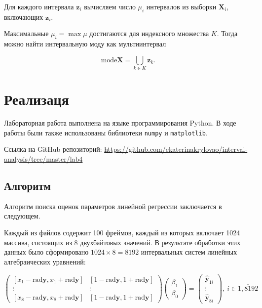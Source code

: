 \documentclass[a4paper,14pt]{article}
\begin{document}
  Для каждого интервала \( \mathbf{z}_i \) вычисляем число \( \mu_i \)
  интервалов из выборки \( \mathbf{X}_i \), включающих \( \mathbf{z}_i \).

  Максимальные \( \mu_i = \max \mu \) достигаются для индексного множества
  \( K \). Тогда можно найти интервальную моду как мультиинтервал

  \begin{equation}
    \text{mode} \mathbf{X} = \bigcup_{k \in K} \mathbf{z}_k.
  \end{equation}

  \section{Реализаця}

  Лабораторная работа выполнена на языке программирования Python. В ходе
  работы были также использованы библиотеки \verb!numpy! и
  \verb!matplotlib!.


  Ссылка на GitHub репозиторий:
  \url{https://github.com/ekaterinakrylovao/interval-analysis/tree/master/lab4}

  \subsection{Алгоритм}
  Алгоритм поиска оценок параметров линейной регрессии заключается в следующем.

  Каждый из файлов содержит 100 фреймов, каждый из которых включает
  1024 массива, состоящих из 8 двухбайтовых значений. В результате
  обработки этих данных было сформировано \( 1024 \times 8 = 8192 \)
  интервальных систем линейных алгебраических уравнений: 

  \[
    \begin{pmatrix}
    [x_1 - \text{rad} \mathbf{y}, x_1 + \text{rad} \mathbf{y}] &
    [1 - \text{rad} \mathbf{y}, 1 + \text{rad} \mathbf{y}] \\
    \vdots & \vdots \\
    [x_8 - \text{rad} \mathbf{y}, x_8 + \text{rad} \mathbf{y}] &
    [1 - \text{rad} \mathbf{y}, 1 + \text{rad} \mathbf{y}]
    \end{pmatrix}
    \begin{pmatrix}
    \beta_1 \\
    \beta_0
    \end{pmatrix}
    = \begin{pmatrix}
    \hat{\mathbf{y}}_{1i} \\
    \vdots \\
    \hat{\mathbf{y}}_{8i}
    \end{pmatrix}, \ i \in \overline{1,8192}
  \]
\end{document}
